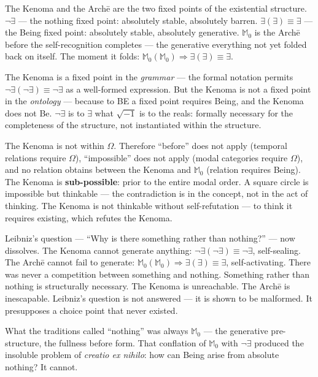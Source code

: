 \documentclass[10pt, openany, oneside]{book}
\begin{document}
\vspace{0.5em}

\noindent The Kenoma and the Arch\={e} are the two fixed points of the existential structure. $\neg\exists$ --- the nothing fixed point: absolutely stable, absolutely barren. $\exists(\exists) \equiv \exists$ --- the Being fixed point: absolutely stable, absolutely generative. $\mathbb{M}_0$ is the Arch\={e} before the self-recognition completes --- the generative everything not yet folded back on itself. The moment it folds: $\mathbb{M}_0(\mathbb{M}_0) \Rightarrow \exists(\exists) \equiv \exists$.

The Kenoma is a fixed point in the \textit{grammar} --- the formal notation permits $\neg\exists(\neg\exists) \equiv \neg\exists$ as a well-formed expression. But the Kenoma is not a fixed point in the \textit{ontology} --- because to BE a fixed point requires Being, and the Kenoma does not Be. $\neg\exists$ is to $\exists$ what $\sqrt{-1}$ is to the reals: formally necessary for the completeness of the structure, not instantiated within the structure.

The Kenoma is not within $\Omega$. Therefore ``before'' does not apply (temporal relations require $\Omega$), ``impossible'' does not apply (modal categories require $\Omega$), and no relation obtains between the Kenoma and $\mathbb{M}_0$ (relation requires Being). The Kenoma is \textbf{sub-possible}: prior to the entire modal order. A square circle is impossible but thinkable --- the contradiction is in the concept, not in the act of thinking. The Kenoma is not thinkable without self-refutation --- to think it requires existing, which refutes the Kenoma.

Leibniz's question --- ``Why is there something rather than nothing?'' --- now dissolves. The Kenoma cannot generate anything: $\neg\exists(\neg\exists) \equiv \neg\exists$, self-sealing. The Arch\={e} cannot fail to generate: $\mathbb{M}_0(\mathbb{M}_0) \Rightarrow \exists(\exists) \equiv \exists$, self-activating. There was never a competition between something and nothing. Something rather than nothing is structurally necessary. The Kenoma is unreachable. The Arch\={e} is inescapable. Leibniz's question is not answered --- it is shown to be malformed. It presupposes a choice point that never existed.

What the traditions called ``nothing'' was always $\mathbb{M}_0$ --- the generative pre-structure, the fullness before form. That conflation of $\mathbb{M}_0$ with $\neg\exists$ produced the insoluble problem of \textit{creatio ex nihilo}: how can Being arise from absolute nothing? It cannot.
\end{document}
